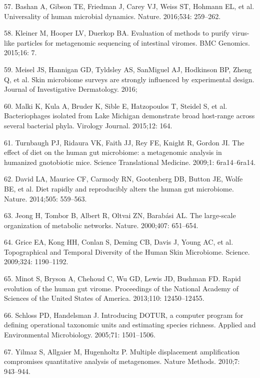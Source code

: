 \documentclass[12pt,]{article}
\begin{document}
\hypertarget{ref-Bashan:2016is}{}
57. Bashan A, Gibson TE, Friedman J, Carey VJ, Weiss ST, Hohmann EL, et
al. Universality of human microbial dynamics. Nature. 2016;534:
259--262.

\hypertarget{ref-Kleiner:2015kd}{}
58. Kleiner M, Hooper LV, Duerkop BA. Evaluation of methods to purify
virus-like particles for metagenomic sequencing of intestinal viromes.
BMC Genomics. 2015;16: 7.

\hypertarget{ref-Meisel:2016iu}{}
59. Meisel JS, Hannigan GD, Tyldsley AS, SanMiguel AJ, Hodkinson BP,
Zheng Q, et al. Skin microbiome surveys are strongly influenced by
experimental design. Journal of Investigative Dermatology. 2016;

\hypertarget{ref-Malki:2015dw}{}
60. Malki K, Kula A, Bruder K, Sible E, Hatzopoulos T, Steidel S, et al.
Bacteriophages isolated from Lake Michigan demonstrate broad host-range
across several bacterial phyla. Virology Journal. 2015;12: 164.

\hypertarget{ref-Turnbaugh:2009hf}{}
61. Turnbaugh PJ, Ridaura VK, Faith JJ, Rey FE, Knight R, Gordon JI. The
effect of diet on the human gut microbiome: a metagenomic analysis in
humanized gnotobiotic mice. Science Translational Medicine. 2009;1:
6ra14--6ra14.

\hypertarget{ref-David:2014cl}{}
62. David LA, Maurice CF, Carmody RN, Gootenberg DB, Button JE, Wolfe
BE, et al. Diet rapidly and reproducibly alters the human gut
microbiome. Nature. 2014;505: 559--563.

\hypertarget{ref-Jeong:2000ima}{}
63. Jeong H, Tombor B, Albert R, Oltvai ZN, Barabási AL. The large-scale
organization of metabolic networks. Nature. 2000;407: 651--654.

\hypertarget{ref-Grice:2009ee}{}
64. Grice EA, Kong HH, Conlan S, Deming CB, Davis J, Young AC, et al.
Topographical and Temporal Diversity of the Human Skin Microbiome.
Science. 2009;324: 1190--1192.

\hypertarget{ref-Minot:2013ih}{}
65. Minot S, Bryson A, Chehoud C, Wu GD, Lewis JD, Bushman FD. Rapid
evolution of the human gut virome. Proceedings of the National Academy
of Sciences of the United States of America. 2013;110: 12450--12455.

\hypertarget{ref-Schloss:2005hz}{}
66. Schloss PD, Handelsman J. Introducing DOTUR, a computer program for
defining operational taxonomic units and estimating species richness.
Applied and Environmental Microbiology. 2005;71: 1501--1506.

\hypertarget{ref-Yilmaz:2010jb}{}
67. Yilmaz S, Allgaier M, Hugenholtz P. Multiple displacement
amplification compromises quantitative analysis of metagenomes. Nature
Methods. 2010;7: 943--944.
\end{document}
